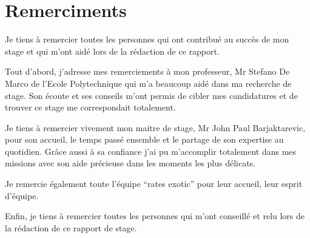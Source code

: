 

\chapter*{Remerciments}

Je tiens à remercier toutes les personnes qui ont contribué au succès de mon stage et qui m'ont aidé lors de la rédaction de ce rapport.

Tout d'abord, j'adresse mes remerciements à mon professeur, Mr Stefano De Marco de l'Ecole Polytechnique qui m'a beaucoup aidé dans ma recherche de stage. Son écoute et ses conseils m'ont permis de cibler mes candidatures et de trouver ce stage me correspondait totalement.

Je tiens à remercier vivement mon maitre de stage, Mr John Paul Barjaktarevic, pour son accueil, le temps passé ensemble et le partage de son expertise au quotidien. Grâce aussi à sa confiance j'ai pu m'accomplir totalement dans mes missions avec son aide précieuse dans les moments les plus délicats.

Je remercie également toute l'équipe ``rates exotic'' pour leur accueil, leur esprit d'équipe. 

Enfin, je tiens à remercier toutes les personnes qui m'ont conseillé et relu lors de la rédaction de ce rapport de stage.

